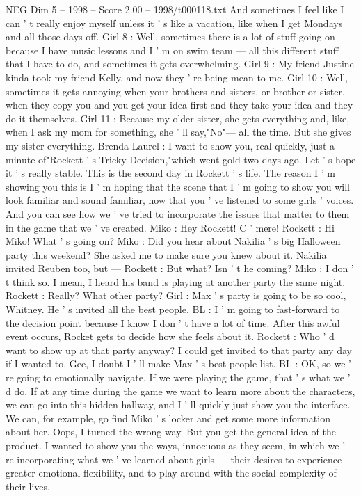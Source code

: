 \begin{textsample}{NEG Dim 5 – 1998 – Score 2.00 – 1998/t000118.txt}
And sometimes I feel like I can ' t really enjoy myself unless it ' s like a vacation, like when I get Mondays and all those days off.
Girl 8 : Well, sometimes there is a lot of stuff going on because I have music lessons and I ' m on swim team — all this different stuff that I have to do, and sometimes it gets overwhelming.
Girl 9 : My friend Justine kinda took my friend Kelly, and now they ' re being mean to me.
Girl 10 : Well, sometimes it gets annoying when your brothers and sisters, or brother or sister, when they copy you and you get your idea first and they take your idea and they do it themselves.
Girl 11 : Because my older sister, she gets everything and, like, when I ask my mom for something, she ' ll say,"No"— all the time.
But she gives my sister everything.
Brenda Laurel : I want to show you, real quickly, just a minute of"Rockett ' s Tricky Decision,"which went gold two days ago.
Let ' s hope it ' s really stable.
This is the second day in Rockett ' s life.
The reason I ' m showing you this is I ' m hoping that the scene that I ' m going to show you will look familiar and sound familiar, now that you ' ve listened to some girls ' voices.
And you can see how we ' ve tried to incorporate the issues that matter to them in the game that we ' ve created.
Miko : Hey Rockett!
C ' mere!
Rockett : Hi Miko!
What ' s going on?
Miko : Did you hear about Nakilia ' s big Halloween party this weekend?
She asked me to make sure you knew about it.
Nakilia invited Reuben too, but — Rockett : But what?
Isn ' t he coming?
Miko : I don ' t think so.
I mean, I heard his band is playing at another party the same night.
Rockett : Really?
What other party?
Girl : Max ' s party is going to be so cool, Whitney.
He ' s invited all the best people.
BL : I ' m going to fast-forward to the decision point because I know I don ' t have a lot of time.
After this awful event occurs, Rocket gets to decide how she feels about it.
Rockett : Who ' d want to show up at that party anyway?
I could get invited to that party any day if I wanted to.
Gee, I doubt I ' ll make Max ' s best people list.
BL : OK, so we ' re going to emotionally navigate.
If we were playing the game, that ' s what we ' d do.
If at any time during the game we want to learn more about the characters, we can go into this hidden hallway, and I ' ll quickly just show you the interface.
We can, for example, go find Miko ' s locker and get some more information about her.
Oops, I turned the wrong way.
But you get the general idea of the product.
I wanted to show you the ways, innocuous as they seem, in which we ' re incorporating what we ' ve learned about girls — their desires to experience greater emotional flexibility, and to play around with the social complexity of their lives.

\end{textsample}

